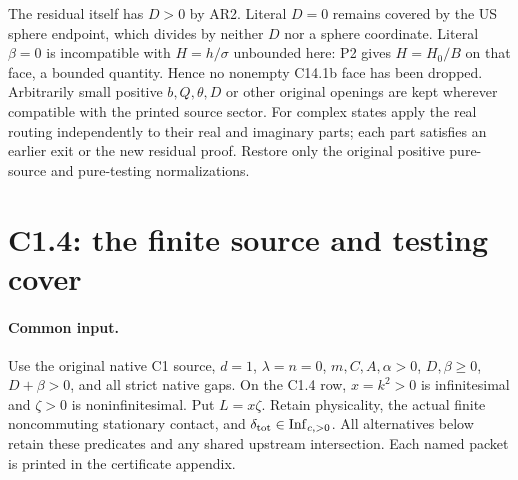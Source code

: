 The residual itself has $D>0$ by AR2. Literal $D=0$ remains
covered by the US sphere endpoint, which divides by neither
$D$ nor a sphere coordinate. Literal $\beta=0$ is incompatible
with $H=h/\sigma$ unbounded here: P2 gives $H=H_0/B$ on
that face, a bounded quantity. Hence no nonempty C14.1b face
has been dropped. Arbitrarily small positive $b,Q,\theta,D$
or other original openings are kept wherever compatible with
the printed source sector. For complex states apply the real
routing independently to their real and imaginary parts;
each part satisfies an earlier exit or the new residual proof.
Restore only the original positive pure-source and pure-testing
normalizations.




\section{\texorpdfstring{C1.4: the finite source and testing cover}{C1.4: the finite source and testing cover}}
\label{component:pfd0dd7bb10cf}

\label{pfd0dd7bb10cf:sec:fresh-c144-c145-join}

\paragraph{Common input.}
Use the original native C1 source, $d=1$, $\lambda=n=0$,
$m,C,A,\alpha>0$, $D,\beta\ge0$, $D+\beta>0$, and all
strict native gaps.  On the C1.4 row, $x=k^2>0$ is infinitesimal
and $\zeta>0$ is noninfinitesimal.  Put $L=x\zeta$.
Retain physicality, the actual finite noncommuting stationary contact,
and $\delta_{\rm tot}\in\operatorname{Inf}_{c,>0}$.
All alternatives below retain these predicates and any shared upstream
intersection.  Each named packet is printed in the certificate appendix.

